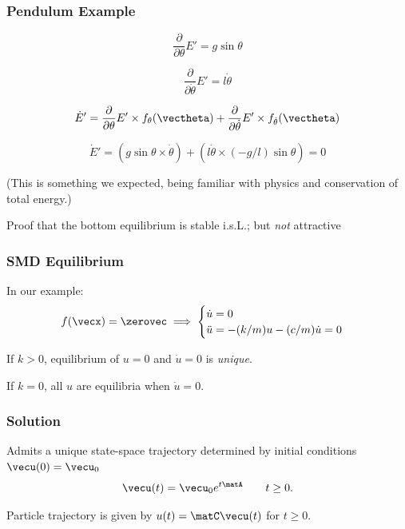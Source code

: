 \documentclass[12pt]{beamer}
\begin{document}
\begin{frame}
\frametitle{Pendulum Example}
\[
\frac{\partial}{\partial\theta} E' = g \sin \theta
\]

\[
\frac{\partial}{\partial\dot\theta} E' = l \dot\theta
\]

\[
\dot E' =
	\frac{\partial}{\partial\theta} E' 
		\times f_{\theta}(\vectheta)
	+ \frac{\partial}{\partial\dot\theta} E'
		\times f_{\dot\theta}(\vectheta)
\]


\[
\dot E' =
	\left( g \sin\theta \times \dot\theta \right)
	+ \left( l \dot\theta \times (-g/l) \sin \theta \right) = 0
\]

(This is something we expected, being familiar with physics and conservation of total energy.)

Proof that the bottom equilibrium is stable i.s.L.; but \emph{not} attractive

\end{frame}











\begin{frame}
\frametitle{SMD Equilibrium}

\begin{itemize}
\vitem In our example:
\[
f(\vecx) = \zerovec \implies
\begin{cases}
	\dot u = 0	\\
	\ddot u = -(k/m) u - (c/m) \dot u = 0
\end{cases}
\]

\vitem If $k > 0$, equilibrium of $u = 0$ and $\dot u = 0$ is \emph{unique}.

\vitem If $k = 0$, all $u$ are equilibria when $\dot u = 0$.
\end{itemize}
\end{frame}



\begin{frame}
\frametitle{Solution}

\begin{itemize}

\vitem Admits a unique state-space trajectory determined by initial conditions $\vecu(0) = \vecu_0$
\[
  \vecu(t) = \vecu_0 e^{t \matA }
  \qquad t \geq 0.
\]

\vitem Particle trajectory is given by $u(t) = \matC \vecu(t)$ for $t \geq 0$.

\end{itemize}
\vfill\null

\end{frame}
\end{document}
